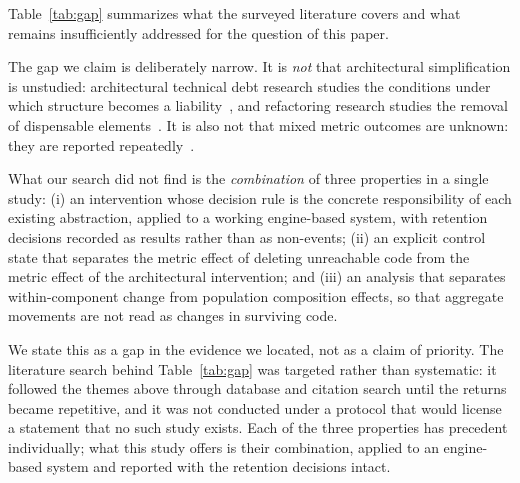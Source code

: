 \documentclass[pdflatex,sn-basic]{sn-jnl}
\begin{document}
Table~\ref{tab:gap} summarizes what the surveyed literature covers and what remains insufficiently addressed for the question of this paper.

The gap we claim is deliberately narrow. It is \emph{not} that architectural simplification is unstudied: architectural technical debt research studies the conditions under which structure becomes a liability~\citep{verdecchia2020,verdecchia2021,li2022}, and refactoring research studies the removal of dispensable elements~\citep{fowler2018,romano2020}. It is also not that mixed metric outcomes are unknown: they are reported repeatedly~\citep{szoke2017,bavota2015,palomba2018}.

What our search did not find is the \emph{combination} of three properties in a single study: (i) an intervention whose decision rule is the concrete responsibility of each existing abstraction, applied to a working engine-based system, with retention decisions recorded as results rather than as non-events; (ii) an explicit control state that separates the metric effect of deleting unreachable code from the metric effect of the architectural intervention; and (iii) an analysis that separates within-component change from population composition effects, so that aggregate movements are not read as changes in surviving code.

We state this as a gap in the evidence we located, not as a claim of priority. The literature search behind Table~\ref{tab:gap} was targeted rather than systematic: it followed the themes above through database and citation search until the returns became repetitive, and it was not conducted under a protocol that would license a statement that no such study exists. Each of the three properties has precedent individually; what this study offers is their combination, applied to an engine-based system and reported with the retention decisions intact.
\end{document}

